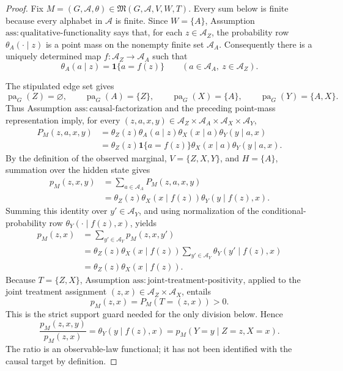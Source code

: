 \documentclass{article}
\begin{document}
\begin{proof}
Fix \(M=(G,\mathcal A,\theta)\in\mathfrak M(G,\mathcal A,V,W,T)\).  Every sum below is finite because every alphabet in \(\mathcal A\) is finite.  Since \(W=\{A\}\), Assumption \(\mathrm{ass:qualitative\text{-}functionality}\) says that, for each \(z\in\mathcal A_Z\), the probability row \(\theta_A(\cdot\mid z)\) is a point mass on the nonempty finite set \(\mathcal A_A\).  Consequently there is a uniquely determined map \(f:\mathcal A_Z\to\mathcal A_A\) such that
\[
 \theta_A(a\mid z)=\mathbf 1\{a=f(z)\}
 \qquad
 (a\in\mathcal A_A,\ z\in\mathcal A_Z).
\]

The stipulated edge set gives
\[
 \operatorname{pa}_G(Z)=\varnothing,
 \qquad
 \operatorname{pa}_G(A)=\{Z\},
 \qquad
 \operatorname{pa}_G(X)=\{A\},
 \qquad
 \operatorname{pa}_G(Y)=\{A,X\}.
\]
Thus Assumption \(\mathrm{ass:causal\text{-}factorization}\) and the preceding point-mass representation imply, for every \((z,a,x,y)\in\mathcal A_Z\times\mathcal A_A\times\mathcal A_X\times\mathcal A_Y\),
\[
\begin{aligned}
 P_M(z,a,x,y)
 &=\theta_Z(z)\theta_A(a\mid z)\theta_X(x\mid a)\theta_Y(y\mid a,x)\\
 &=\theta_Z(z)\mathbf 1\{a=f(z)\}\theta_X(x\mid a)\theta_Y(y\mid a,x).
\end{aligned}
\]
By the definition of the observed marginal, \(V=\{Z,X,Y\}\), and \(H=\{A\}\), summation over the hidden state gives
\[
\begin{aligned}
 p_M(z,x,y)
 &=\sum_{a\in\mathcal A_A}P_M(z,a,x,y)\\
 &=\theta_Z(z)\theta_X(x\mid f(z))\theta_Y(y\mid f(z),x).
\end{aligned}
\]
Summing this identity over \(y'\in\mathcal A_Y\), and using normalization of the conditional-probability row \(\theta_Y(\cdot\mid f(z),x)\), yields
\[
\begin{aligned}
 p_M(z,x)
 &=\sum_{y'\in\mathcal A_Y}p_M(z,x,y')\\
 &=\theta_Z(z)\theta_X(x\mid f(z))
   \sum_{y'\in\mathcal A_Y}\theta_Y(y'\mid f(z),x)\\
 &=\theta_Z(z)\theta_X(x\mid f(z)).
\end{aligned}
\]
Because \(T=\{Z,X\}\), Assumption \(\mathrm{ass:joint\text{-}treatment\text{-}positivity}\), applied to the joint treatment assignment \((z,x)\in\mathcal A_Z\times\mathcal A_X\), entails
\[
 p_M(z,x)=P_M(T=(z,x))>0.
\]
This is the strict support guard needed for the only division below.  Hence
\[
 \frac{p_M(z,x,y)}{p_M(z,x)}
 =\theta_Y(y\mid f(z),x)
 =p_M(Y=y\mid Z=z,X=x).
\]
The ratio is an observable-law functional; it has not been identified with the causal target by definition.


\end{proof}
\end{document}
